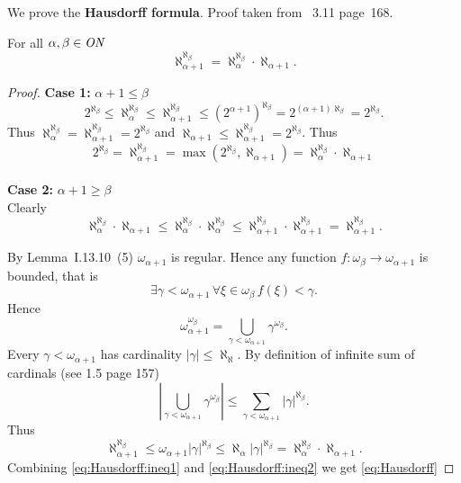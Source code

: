 We prove the \textbf{Hausdorff formula}.
Proof taken from \cite{Hrbacek1999}~{3.11} page~168.
\begin{llem} \label{llem:Hausdorff:formula}
For all \(\alpha, \beta \in \mathit{ON}\)
\begin{equation} \label{eq:Hausdorff}
\aleph_{\alpha+1}^{\aleph_\beta} = \aleph_\alpha^{\aleph_\beta} \cdot \aleph_{\alpha+1}.
\end{equation}
\end{llem}
\begin{proof}
\textbf{Case 1:} \(\alpha+1 \leq \beta\)
\begin{equation*}
2^{\aleph_\beta} 
\leq \aleph_\alpha^{\aleph_\beta} 
\leq \aleph_{\alpha+1}^{\aleph_\beta} 
\leq \left(2^{\alpha+1}\right)^{\aleph_\beta} 
= 2^{(\alpha+1){\aleph_\beta}}
= 2^{\aleph_\beta}.
\end{equation*}
Thus \(\aleph_\alpha^{\aleph_\beta} = \aleph_{\alpha+1}^{\aleph_\beta} = 2^{\aleph_\beta}\)
and \(\aleph_{\alpha+1} \leq \aleph_{\alpha+1}^{\aleph_\beta} = 2^{\aleph_\beta}\).
Thus
\begin{equation*}
 2^{\aleph_\beta} = \aleph_{\alpha+1}^{\aleph_\beta}
 = \max\left(2^{\aleph_\beta}, \aleph_{\alpha+1}\right)
 = \aleph_\alpha^{\aleph_\beta} \cdot \aleph_{\alpha+1}
\end{equation*}
\\
\textbf{Case 2:} \(\alpha+1 \geq \beta\)\\
Clearly
\begin{equation} \label{eq:Hausdorff:ineq1}
 \aleph_\alpha^{\aleph_\beta} \cdot \aleph_{\alpha+1}
 \leq \aleph_\alpha^{\aleph_\beta} \cdot \aleph_\alpha^{\aleph_\beta}
 \leq \aleph_{\alpha+1}^{\aleph_\beta} \cdot \aleph_{\alpha+1}^{\aleph_\beta}
 = \aleph_{\alpha+1}^{\aleph_\beta}.
\end{equation}

By Lemma~I.13.10~(5) \(\omega_{\alpha+1}\) is regular.
Hence any function \(f:\omega_\beta \to \omega_{\alpha+1}\) is bounded,
that is
\begin{equation*}
\exists \gamma < \omega_{\alpha+1}\, \forall \xi\in \omega_\beta\, f(\xi) < \gamma.
\end{equation*}
Hence
\begin{equation*}
\omega_{\alpha+1}^{\omega_\beta}
= \bigcup_{\gamma < \omega_{\alpha+1}} \gamma^{\omega_\beta}.
\end{equation*}
Every \(\gamma < \omega_{\alpha+1}\)
has cardinality \(|\gamma| \leq \aleph_\aleph\).
By definition of infinite sum of cardinals (see \cite{Hrbacek1999} 1.5 page 157)
\begin{equation*}
\left|\bigcup_{\gamma < \omega_{\alpha+1}} \gamma^{\omega_\beta}\right|
\leq
\sum_{\gamma < \omega_{\alpha+1}} |\gamma|^{\aleph_\beta}.
\end{equation*}
Thus
\begin{equation} \label{eq:Hausdorff:ineq2}
\aleph_{\alpha+1}^{\aleph_\beta}
\leq \omega_{\alpha+1} |\gamma|^{\aleph_\beta}
\leq \aleph_\alpha |\gamma|^{\aleph_\beta}
= \aleph_\alpha^{\aleph_\beta} \cdot \aleph_{\alpha+1}.
\end{equation}
Combining  \eqref{eq:Hausdorff:ineq1} and \eqref{eq:Hausdorff:ineq2}
we get \eqref{eq:Hausdorff}
\end{proof}

